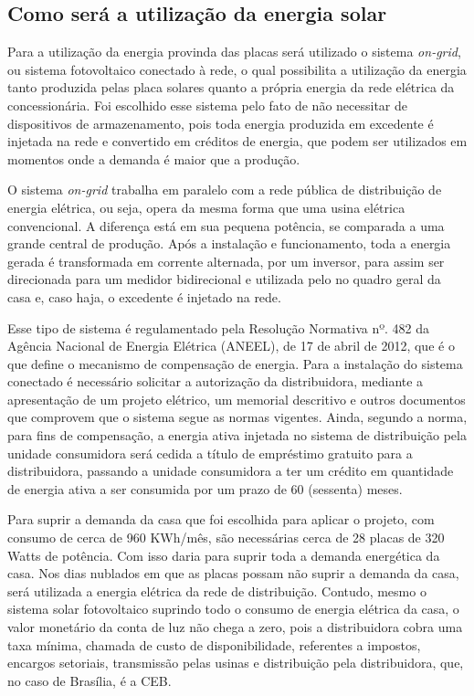 \subsection{Como será a utilização da energia solar}
\par Para a utilização da energia provinda das placas será utilizado o sistema \textit{on-grid}, ou sistema fotovoltaico conectado à rede, o qual possibilita a utilização da energia tanto produzida pelas placa solares quanto a própria energia da rede elétrica da concessionária. Foi escolhido esse sistema pelo fato de não necessitar de dispositivos de armazenamento, pois toda energia produzida em excedente é injetada na rede e convertido em créditos de energia, que podem ser utilizados em momentos onde a demanda é maior que a produção.
\par O sistema \textit{on-grid} trabalha em paralelo com a rede pública de distribuição de energia elétrica, ou seja, opera da mesma forma que uma usina elétrica convencional. A diferença está em sua pequena potência, se comparada a uma grande central de produção. Após a instalação e funcionamento, toda a energia gerada é transformada em corrente alternada, por um inversor, para assim ser direcionada para um medidor bidirecional e utilizada pelo no quadro geral da casa e, caso haja, o excedente é injetado na rede.
\par Esse tipo de sistema é regulamentado pela Resolução Normativa nº. 482 da Agência Nacional de Energia Elétrica (ANEEL), de 17 de abril de 2012, que é o que define o mecanismo de compensação de energia. Para a instalação do sistema conectado é necessário solicitar a autorização da distribuidora, mediante a apresentação de um projeto elétrico, um memorial descritivo e outros documentos que comprovem que o sistema segue as normas vigentes. Ainda, segundo a norma, para fins de compensação, a energia ativa injetada no sistema de distribuição pela unidade consumidora será cedida a título de empréstimo gratuito para a distribuidora, passando a unidade consumidora a ter um crédito em quantidade de energia ativa a ser consumida por um prazo de 60 (sessenta) meses.
\par Para suprir a demanda da casa que foi escolhida para aplicar o projeto, com consumo de cerca de 960 KWh/mês, são necessárias cerca de 28 placas de 320 Watts de potência. Com isso daria para suprir toda a demanda energética da casa. Nos dias nublados em que as placas possam não suprir a demanda da casa, será utilizada a energia elétrica da rede de distribuição. Contudo, mesmo o sistema solar fotovoltaico suprindo todo o consumo de energia elétrica da casa, o valor monetário da conta de luz não chega a zero, pois a distribuidora cobra uma taxa mínima, chamada de custo de disponibilidade, referentes a impostos, encargos setoriais, transmissão pelas usinas e distribuição pela distribuidora, que, no caso de Brasília, é a CEB.

